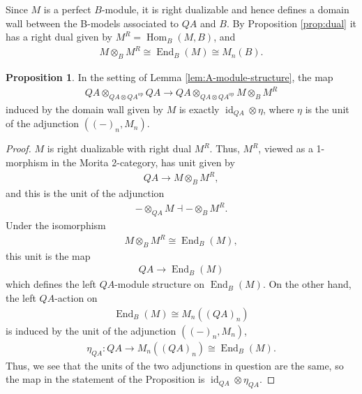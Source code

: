 \documentclass{article}
\numberwithin{equation}{section}
\theoremstyle{quest}
\theoremstyle{definition}
\newtheorem{prop}[thm]{Proposition}
\theoremstyle{remark}
\DeclareMathOperator{\Hom}{Hom}
\DeclareMathOperator{\id}{id}
\DeclareMathOperator{\End}{End}
\begin{document}
Since $M$ is a perfect $B$-module, it is right dualizable and hence defines a domain wall between the B-models associated to $QA$ and $B$. By Proposition \ref{prop:dual} it has a right dual given by $M^R=\Hom_B(M,B)$, and
\begin{align*}
	M\otimes _BM^R\cong\End_B(M)\cong M_n(B).
\end{align*}
\begin{prop}\label{prop:domain-wall-map-is-counit}
	In the setting of Lemma \ref{lem:A-module-structure}, the map
\begin{align*}
	QA \otimes _{QA\otimes QA^{\text{op}}}QA\to QA\otimes _{QA\otimes QA^{\text{op}}}M\otimes _BM^R
\end{align*}
induced by the domain wall given by $M$ is exactly $\id_{QA}\otimes \eta$, where $\eta$ is the unit of the adjunction $((-)_n,M_n)$. 
\end{prop}
\begin{proof}
	$M$ is right dualizable with right dual $M^R$. Thus, $M^R$, viewed as a 1-morphism in the Morita 2-category, has unit given by
	\begin{align*}
		QA\to M\otimes _BM^R,
	\end{align*} 
	and this is the unit of the adjunction
	\begin{align*}
		-\otimes _{QA}M\dashv-\otimes _BM^R.
	\end{align*} 
	Under the isomorphism
	\begin{align*}
		M\otimes _BM^R\cong \End_B(M),
	\end{align*} 
	this unit is the map
	\begin{align*}
		QA\to \End_B(M)
	\end{align*} 
	which defines the left $QA$-module structure on $\End_B(M)$. On the other hand, the left $QA$-action on
	\begin{align*}
		\End_B(M)\cong M_n((QA)_n)
	\end{align*} 
	is induced by the unit of the adjunction $((-)_n,M_n)$,
	\begin{align*}
		\eta_{QA}:QA\to M_n((QA)_n)\cong\End_{B}(M).
	\end{align*} 
	Thus, we see that the units of the two adjunctions in question are the same, so the map in the statement of the Proposition is $\id_{QA}\otimes \eta_{QA}$.
\end{proof}
 
\end{document}
